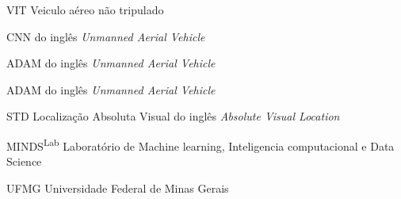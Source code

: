 \begin{siglas}
  
  \item[VIT] Veiculo aéreo não tripulado
  \item[CNN] do inglês \textit{Unmanned Aerial Vehicle}
  \item[ADAM] do inglês \textit{Unmanned Aerial Vehicle}
  \item[ADAM] do inglês \textit{Unmanned Aerial Vehicle}
  \item[STD] Localização Absoluta Visual do inglês \textit{Absolute Visual Location}
  \item[MINDS\textsuperscript{Lab}] Laboratório de Machine learning, Inteligencia computacional e Data Science
  \item[UFMG] Universidade Federal de Minas Gerais
 
\end{siglas}
